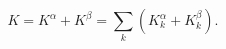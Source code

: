 \begin{equation}
K=K^{\alpha} + K^{\beta}=
\sum_{k}\left(K_{k}^{\alpha} + K_{k}^{\beta}\right).
\label{kst}
\end{equation}

